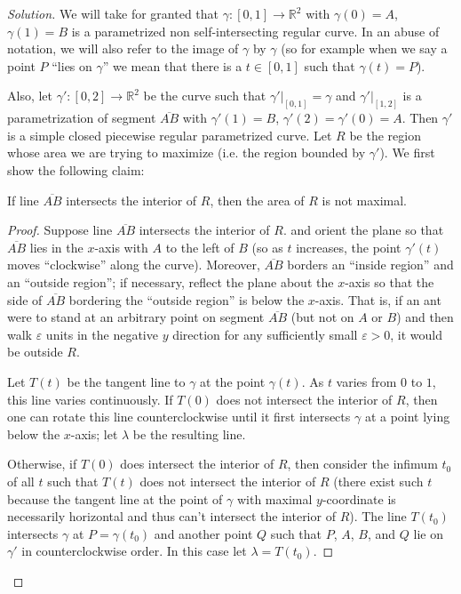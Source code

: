 \documentclass[11pt]{scrartcl}
\providecommand{\ol}{\overline}
\providecommand{\eps}{\varepsilon}
\providecommand{\RR}{\mathbb R}
\newenvironment{soln}{\begin{proof}[Solution]}{\end{proof}}
\begin{document}
\begin{soln}
	We will take for granted that $\gamma\colon[0,1]\to\RR^2$
	with $\gamma(0) = A$, $\gamma(1) = B$ is a
	parametrized non self-intersecting regular curve.
	In an abuse of notation, we will also refer to the image of $\gamma$
	by $\gamma$ (so for example when we say a point $P$ ``lies on $\gamma$''
	we mean that there is a $t\in[0,1]$ such that $\gamma(t) = P$).
	
	Also, let $\gamma'\colon[0,2]\to\RR^2$ be the curve such that
	$\gamma'|_{[0,1]} = \gamma$ and $\gamma'|_{[1,2]}$ is a parametrization
	of segment $\ol{AB}$ with $\gamma'(1) = B$, $\gamma'(2) = \gamma'(0) = A$.
	Then $\gamma'$ is a simple closed piecewise regular parametrized curve.
	Let $R$ be the region whose area we are trying to maximize
	(i.e. the region bounded by $\gamma'$).
	We first show the following claim:
	\begin{claim*}
		If line $\ol{AB}$ intersects the interior of $R$, then
		the area of $R$ is not maximal.
	\end{claim*}
	\begin{proof}
		Suppose line $\ol{AB}$ intersects the interior of $R$.
		and orient the plane so that $\ol{AB}$ lies in the $x$-axis
		with $A$ to the left of $B$ (so as $t$ increases,
		the point $\gamma'(t)$ moves ``clockwise'' along the curve).
		Moreover, $\ol{AB}$ borders an ``inside region'' and an
		``outside region''; if necessary, reflect the plane about the $x$-axis
		so that the side of $\ol{AB}$ bordering the ``outside region''
		is below the $x$-axis. That is, if an ant were to stand at
		an arbitrary point on segment $\ol{AB}$ (but not on $A$ or $B$)
		and then walk $\eps$ units in the negative $y$ direction
		for any sufficiently small $\eps > 0$, it would be outside $R$.
		
		Let $T(t)$ be the tangent line to $\gamma$ at the point $\gamma(t)$.
		As $t$ varies from $0$ to $1$, this line varies continuously.
		If $T(0)$ does not intersect the interior of $R$, then
		one can rotate this line counterclockwise until it first intersects
		$\gamma$ at a point lying below the $x$-axis;
		let $\lambda$ be the resulting line.
		
		Otherwise, if $T(0)$ does intersect the interior of $R$, then
		consider the infimum $t_0$ of all $t$ such that $T(t)$
		does not intersect the interior of $R$ (there exist such $t$
		because the tangent line at the point of $\gamma$
		with maximal $y$-coordinate is necessarily horizontal
		and thus can't intersect the interior of $R$).
		The line $T(t_0)$ intersects $\gamma$ at $P = \gamma(t_0)$ and
		another point $Q$ such that $P$, $A$, $B$, and $Q$
		lie on $\gamma'$ in counterclockwise order.
		In this case let $\lambda = T(t_0)$.
		

\end{proof}
\end{soln}
\end{document}
